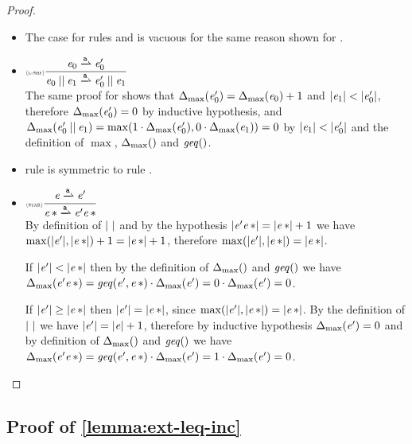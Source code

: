 \begin{proof}
\begin{description}
\begin{itemize}
    \item The case for rules  and  is vacuous for the same reason shown for .
    \item $\Rule{l-shf}{\re_0\parDer{\sym}\re'_0}{\re_0\shuffleop\re_1\parDer{\sym}\re'_0\shuffleop\re_1}{}$\\[2ex]
          The same proof for  shows that ${\Delta_{\max}}({\mathit {e}_0'})={\Delta_{\max}}({\mathit {e}_0})+1$ and ${\mid}{\mathit {e}_1}{\mid}<{\mid}{\mathit {e}'_0}{\mid}$, therefore ${\Delta_{\max}}({\mathit {e}'_0})=0$ by inductive hypothesis, and ${\Delta_{\max}}({\mathit {e}'_0\mathbin{||}\mathit {e}_1})=\max(1\cdot{\Delta_{\max}}({\mathit {e}_0'}),0\cdot{\Delta_{\max}}({\mathit {e}_1}))=0$ by ${\mid}{\mathit {e}_1}{\mid}<{\mid}{\mathit {e}'_0}{\mid}$ and the definition of $\max$, ${\Delta_{\max}}({})$ and $\mathit{geq}()$.
    \item rule  is symmetric to rule .
    \item $\Rule{star}{\re\parDer{\sym}\re'}{\starop{\re}\parDer{\sym}\re'\catop\starop{\re}}{}$\\[2ex]
          By definition of ${\mid}{\ }{\mid}$ and by the hypothesis ${\mid}{\mathit {e}'{{\mathit {e}}\mathop{*}}}{\mid}={\mid}{{{\mathit {e}}\mathop{*}}}{\mid}+1$ we have
          $\max({\mid}{\mathit {e}'}{\mid},{\mid}{{{\mathit {e}}\mathop{*}}}{\mid})+1={\mid}{{{\mathit {e}}\mathop{*}}}{\mid}+1$, therefore
          $\max({\mid}{\mathit {e}'}{\mid},{\mid}{{{\mathit {e}}\mathop{*}}}{\mid})={\mid}{{{\mathit {e}}\mathop{*}}}{\mid}$.

          If ${\mid}{\mathit {e}'}{\mid}<{\mid}{{{\mathit {e}}\mathop{*}}}{\mid}$ then by the definition of ${\Delta_{\max}}({})$ and $\mathit{geq}()$ we have ${\Delta_{\max}}({\mathit {e}'{{\mathit {e}}\mathop{*}}})=\mathit{geq}({\mathit {e}'},{{{\mathit {e}}\mathop{*}}})\cdot{\Delta_{\max}}({\mathit {e}'})=0\cdot{\Delta_{\max}}({\mathit {e}'})=0$.

          If ${\mid}{\mathit {e}'}{\mid}\geq{\mid}{{{\ensuremath{\mathit {e}}}\mathop{*}}}{\mid}$ then ${\mid}{\mathit {e}'}{\mid}={\mid}{{{\mathit {e}}\mathop{*}}}{\mid}$, since $\max({\mid}{\mathit {e}'}{\mid},{\mid}{{{\mathit {e}}\mathop{*}}}{\mid})={\mid}{{{\mathit {e}}\mathop{*}}}{\mid}$.
          By the definition of ${\mid}{\ }{\mid}$ we have ${\mid}{\mathit {e}'}{\mid}={\mid}{\mathit {e}}{\mid}+1$, therefore
          by inductive hypothesis ${\Delta_{\max}}({\mathit {e}'})=0$ and by definition of ${\Delta_{\max}}({})$ and $\mathit{geq}()$ we have ${\Delta_{\max}}({\mathit {e}'{{\mathit {e}}\mathop{*}}})=\mathit{geq}({\mathit {e}'},{{{\mathit {e}}\mathop{*}}})\cdot{\Delta_{\max}}({\mathit {e}'})=1\cdot{\Delta_{\max}}({\mathit {e}'})=0$.
   \end{itemize}
 \end{description}
\end{proof}

\subsection*{Proof of \cref{lemma:ext-leq-inc}}

